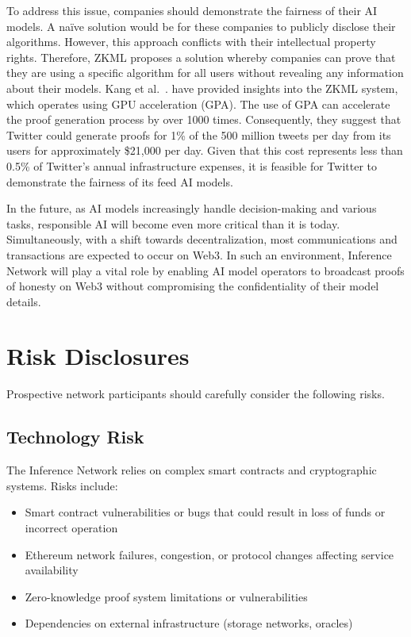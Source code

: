\documentclass[conference]{IEEEtran}
\begin{document}


To address this issue, companies should demonstrate the fairness of their AI models. A naïve solution would be for these companies to publicly disclose their algorithms. However, this approach conflicts with their intellectual property rights. Therefore, ZKML proposes a solution whereby companies can prove that they are using a specific algorithm for all users without revealing any information about their models. Kang et al.~\cite{TensorPlonkMedium}. have provided insights into the ZKML system, which operates using GPU acceleration (GPA). The use of GPA can accelerate the proof generation process by over 1000 times. Consequently, they suggest that Twitter could generate proofs for 1\% of the 500 million tweets per day from its users for approximately \$21,000 per day. Given that this cost represents less than 0.5\% of Twitter's annual infrastructure expenses, it is feasible for Twitter to demonstrate the fairness of its feed AI models.

In the future, as AI models increasingly handle decision-making and various tasks, responsible AI will become even more critical than it is today. Simultaneously, with a shift towards decentralization, most communications and transactions are expected to occur on Web3. In such an environment, Inference Network will play a vital role by enabling AI model operators to broadcast proofs of honesty on Web3 without compromising the confidentiality of their model details.

\section{Risk Disclosures}

Prospective network participants should carefully consider the following risks.

\subsection{Technology Risk}
The Inference Network relies on complex smart contracts and cryptographic systems. Risks include:
\begin{itemize}
\item Smart contract vulnerabilities or bugs that could result in loss of funds or incorrect operation
\item Ethereum network failures, congestion, or protocol changes affecting service availability
\item Zero-knowledge proof system limitations or vulnerabilities
\item Dependencies on external infrastructure (storage networks, oracles)
\end{itemize}
\end{document}
